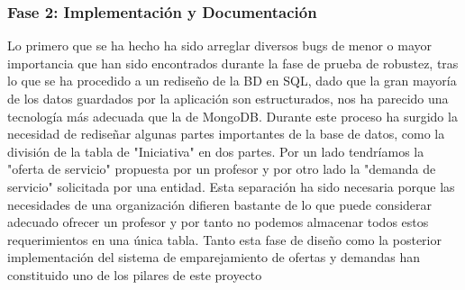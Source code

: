 \documentclass{article}
\begin{document}
\subsubsection{Fase 2: Implementación y Documentación}
Lo primero que se ha hecho ha sido arreglar diversos bugs de menor o mayor importancia que han sido encontrados durante la fase de prueba de robustez, tras lo que se ha procedido a un rediseño de la BD en SQL, dado que la gran mayoría de los datos guardados por la aplicación son estructurados, nos ha parecido una tecnología más adecuada que la de MongoDB.
Durante este proceso ha surgido la necesidad de rediseñar algunas partes importantes de la base de datos, como la división de la tabla de "Iniciativa" en dos partes. Por un lado tendríamos la "oferta de servicio" propuesta por un profesor y por otro lado la "demanda de servicio" solicitada por una entidad. Esta separación ha sido necesaria porque las necesidades de una organización difieren bastante de lo que puede considerar adecuado ofrecer un profesor y por tanto no podemos almacenar todos estos requerimientos en una única tabla.
Tanto esta fase de diseño como la posterior implementación del sistema de emparejamiento de ofertas y demandas han constituido uno de los pilares de este proyecto


\end{document}

